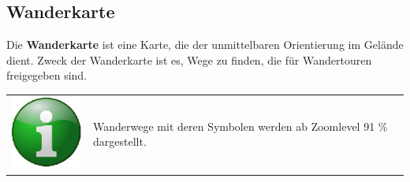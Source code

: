 \documentclass[10pt]{scrreprt}
\begin{document}
\vspace{5mm}
\subsection{Wanderkarte}  
Die \textbf{Wanderkarte} ist eine Karte, die der unmittelbaren Orientierung im Gelände dient. Zweck der Wanderkarte ist es, Wege zu finden, die für Wandertouren freigegeben sind.

\vspace{3mm}
\begin{figure}[!htb]
	\centering
    \hspace{5mm}
\end{figure} 

\vspace{3mm}
\begin{tabular}{>{\centering \arraybackslash}m{1cm} m{14cm}}
\includegraphics[scale=0.5]{images/info.eps} & Wanderwege mit deren Symbolen werden ab Zoomlevel 91 \% dargestellt.
\end{tabular}
\end{document}

